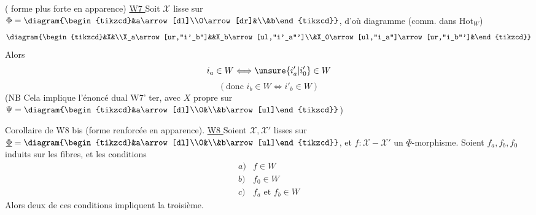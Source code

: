  ( forme plus forte en apparence)
\uline{W7 } Soit $\mathcal X$ lisse sur $\Phi=\diagram{\begin{tikzcd}&a\arrow[dl]\\0\arrow[dr]&\\&b\end{tikzcd}}$, d'où diagramme (comm. dans $\mathrm{Hot}_W$)
\[\diagram{\begin{tikzcd}&X&\\X_a\arrow[ur,"i'_b"]&&X_b\arrow[ul,"i'_a"']\\&X_0\arrow[ul,"i_a"]\arrow[ur,"i_b"']&\end{tikzcd}}\]
Alors
\[i_a\in W\Longleftrightarrow\unsure{i'_a|i'_0}\in W\]
\[(\text{donc }i_b\in W\Longleftrightarrow i'_b\in W)\]
(NB Cela implique l'énoncé dual W7' ter, avec $X$ propre sur $\Psi=\diagram{\begin{tikzcd}&a\arrow[dl]\\0&\\&b\arrow[ul]\end{tikzcd}}$)

Corollaire de W8 bis (forme renforcée en apparence).
\uline{W8 } Soient $\mathcal X,\mathcal X'$ lisses sur $\underline\Phi=\diagram{\begin{tikzcd}&a\arrow[dl]\\0&\\&b\arrow[ul]\end{tikzcd}}$, et $f:\mathcal X-\mathcal X'$ un $\underline\Phi$-morphisme. Soient $f_a,f_b,f_0$ induits sur les fibres, et les conditions
\[\begin{array}{ll}a)&f\in W\\b)&f_0\in W\\c)&f_a\text{ et }f_b\in W\end{array}\]
Alors deux de ces conditions impliquent la troisième.


